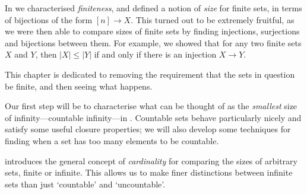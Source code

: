 
In  we characterised \textit{finiteness}, and defined a notion of \textit{size} for finite sets, in terms of bijections of the form $[n] \to X$. This turned out to be extremely fruitful, as we were then able to compare sizes of finite sets by finding injections, surjections and bijections between them. For example, we showed that for any two finite sets $X$ and $Y$, then $|X| \le |Y|$ if and only if there is an injection $X \to Y$.

This chapter is dedicated to removing the requirement that the sets in question be finite, and then seeing what happens.

Our first step will be to characterise what can be thought of as the \textit{smallest} size of infinity---countable infinity---in . Countable sets behave particularly nicely and satisfy some useful closure properties; we will also develop some techniques for finding when a set has too many elements to be countable.

 introduces the general concept of \textit{cardinality} for comparing the sizes of arbitrary sets, finite or infinite. This allows us to make finer distinctions between infinite sets than just `countable' and `uncountable'.